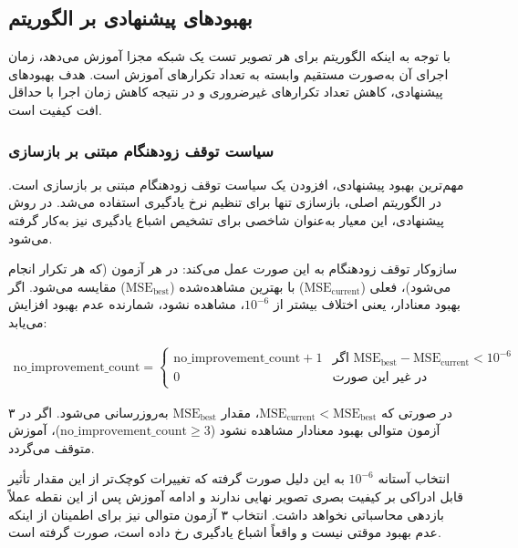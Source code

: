 \subsection{بهبودهای پیشنهادی بر الگوریتم }
\label{subsec:zssr_proposed}

با توجه به اینکه الگوریتم  برای هر تصویر تست یک شبکه مجزا آموزش می‌دهد، زمان اجرای آن به‌صورت مستقیم وابسته به تعداد تکرارهای آموزش است. هدف بهبودهای پیشنهادی، کاهش تعداد تکرارهای غیرضروری و در نتیجه کاهش زمان اجرا با حداقل افت کیفیت است.

\subsubsection{سیاست توقف زودهنگام مبتنی بر  بازسازی}
\label{subsec:early_stop}

مهم‌ترین بهبود پیشنهادی، افزودن یک سیاست توقف زودهنگام مبتنی بر  بازسازی است. در الگوریتم اصلی،  بازسازی تنها برای تنظیم نرخ یادگیری استفاده می‌شد. در روش پیشنهادی، این معیار به‌عنوان شاخصی برای تشخیص اشباع یادگیری نیز به‌کار گرفته می‌شود.

سازوکار توقف زودهنگام به این صورت عمل می‌کند: در هر آزمون (که هر  تکرار انجام می‌شود)،  فعلی ($\text{MSE}_{\text{current}}$) با بهترین  مشاهده‌شده ($\text{MSE}_{\text{best}}$) مقایسه می‌شود. اگر بهبود معنادار، یعنی اختلاف بیشتر از $10^{-6}$، مشاهده نشود، شمارنده عدم بهبود افزایش می‌یابد:

\begin{align}
\text{no\_improvement\_count} = 
\begin{cases}
\text{no\_improvement\_count} + 1 & \text{اگر } \text{MSE}_{\text{best}} - \text{MSE}_{\text{current}} < 10^{-6} \\
0 & \text{در غیر این صورت}
\end{cases}
\end{align}

در صورتی که $\text{MSE}_{\text{current}} < \text{MSE}_{\text{best}}$، مقدار $\text{MSE}_{\text{best}}$ به‌روزرسانی می‌شود. اگر در ۳ آزمون متوالی بهبود معنادار مشاهده نشود ($\text{no\_improvement\_count} \geq 3$)، آموزش متوقف می‌گردد.

انتخاب آستانه $10^{-6}$ به این دلیل صورت گرفته که تغییرات  کوچک‌تر از این مقدار تأثیر قابل ادراکی بر کیفیت بصری تصویر نهایی ندارند و ادامه آموزش پس از این نقطه عملاً بازدهی محاسباتی نخواهد داشت. انتخاب ۳ آزمون متوالی نیز برای اطمینان از اینکه عدم بهبود موقتی نیست و واقعاً اشباع یادگیری رخ داده است، صورت گرفته است.

